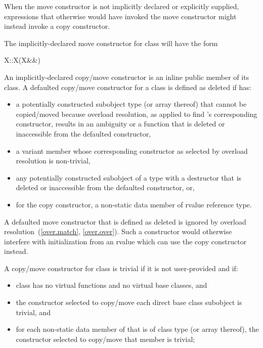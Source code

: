 \begin{note}
When the move constructor is not implicitly declared or explicitly supplied,
expressions that otherwise would have invoked the move constructor might instead invoke
a copy constructor.
\end{note}

\pnum
The implicitly-declared move constructor for class  will have the form
\begin{codeblock}
X::X(X&&)
\end{codeblock}

\pnum
An implicitly-declared copy/move constructor is an
inline public member of its class.
A defaulted copy/\brk{}move constructor for a class
   is defined as deleted if  has:
\begin{itemize}
\item a potentially constructed subobject type
   (or array thereof) that cannot be copied/moved because
  overload resolution, as applied to find
  's
  corresponding constructor, results in an ambiguity or
  a function that is deleted or inaccessible from the
  defaulted constructor,

\item a variant member whose corresponding constructor
  as selected by overload resolution is non-trivial,

\item any potentially constructed subobject of a type
  with a destructor that is deleted or inaccessible from the defaulted
  constructor, or,

\item for the copy constructor, a non-static data member of rvalue reference type.
\end{itemize}

\begin{note}
A defaulted move constructor that is defined as deleted is ignored by overload
resolution~(\ref{over.match}, \ref{over.over}).
Such a constructor would otherwise interfere with initialization from
an rvalue which can use the copy constructor instead.
\end{note}

\pnum
{}%
%
A copy/move constructor for class
is
trivial
if it is not user-provided and if:
\begin{itemize}
\item
class
has no virtual functions
and no virtual base classes, and

\item
the constructor selected to copy/move each direct base class subobject is trivial, and

\item
for each non-static data member of
that is of class type (or array thereof),
the constructor selected to copy/move that member is trivial;
\end{itemize}

